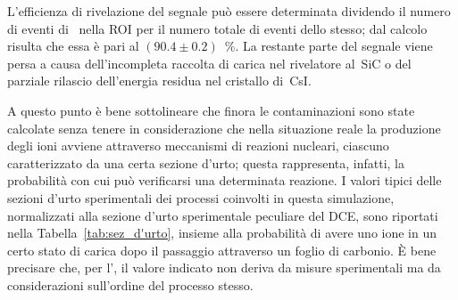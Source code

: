 L'efficienza di rivelazione del segnale può essere determinata dividendo il numero di eventi di~ nella ROI per il numero totale di eventi dello stesso; dal calcolo risulta che essa è pari al $(90.4 \pm 0.2)$~\%.
La restante parte del segnale viene persa a causa dell'incompleta raccolta di carica nel rivelatore al~SiC o del parziale rilascio dell'energia residua nel cristallo di~CsI.






A questo punto è bene sottolineare che finora le contaminazioni sono state calcolate senza tenere in considerazione che nella situazione reale la produzione degli ioni avviene attraverso meccanismi di reazioni nucleari, ciascuno caratterizzato da una certa sezione d'urto; questa rappresenta, infatti, la probabilità con cui può verificarsi una determinata reazione.
I valori tipici delle sezioni d'urto sperimentali dei processi coinvolti in questa simulazione, normalizzati alla sezione d'urto sperimentale peculiare del DCE, sono riportati nella Tabella~\ref{tab:sez_d'urto}, insieme alla probabilità di avere uno ione in un certo stato di carica dopo il passaggio attraverso un foglio di carbonio.
È bene precisare che, per l', il valore indicato non deriva da misure sperimentali ma da considerazioni sull'ordine del processo stesso.
